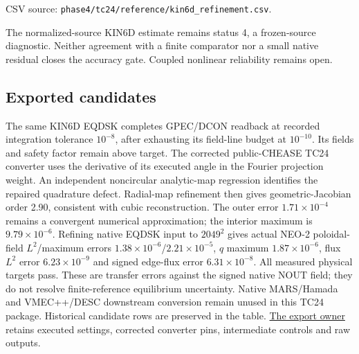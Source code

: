 \documentclass[10pt,a4paper]{article}
\newcommand{\tcroot}{https://gitlab.tugraz.at/plasma/proj/ntv/iter_tc24/-/blob/5f267d12c/}
\newcommand{\tcfile}[2]{\href{\tcroot#1}{#2}}
\newcommand{\dataref}[1]{{\footnotesize CSV source: \texttt{#1}}}
\begin{document}
\begin{center}\small

\end{center}
\dataref{phase4/tc24/reference/kin6d\_refinement.csv}.

The normalized-source KIN6D estimate remains status 4, a frozen-source
diagnostic. Neither agreement with a finite comparator nor a small native
residual closes the accuracy gate. Coupled nonlinear reliability remains open.

\subsection*{Exported candidates}
\begin{center}\small

\end{center}

The same KIN6D EQDSK completes GPEC/DCON readback at recorded integration
tolerance $10^{-8}$, after exhausting its field-line budget at $10^{-10}$.
Its fields and safety factor remain above target. The corrected public-CHEASE TC24 converter uses the derivative of its
executed angle in the Fourier projection weight. An independent noncircular
analytic-map regression identifies the repaired quadrature defect.
Radial-map refinement then gives geometric-Jacobian order 2.90, consistent
with cubic reconstruction. The outer error $1.71\times10^{-4}$ remains a
convergent numerical approximation; the interior maximum is
$9.79\times10^{-6}$. Refining native EQDSK input to $2049^2$ gives actual
NEO-2 poloidal-field $L^2$/maximum errors $1.38\times10^{-6}$/$2.21\times10^{-5}$,
$q$ maximum $1.87\times10^{-6}$, flux $L^2$ error $6.23\times10^{-9}$ and
signed edge-flux error $6.31\times10^{-8}$. All measured physical targets
pass. These are transfer errors against the signed native NOUT field;
they do not resolve finite-reference equilibrium uncertainty.
Native MARS/Hamada and VMEC++/DESC downstream conversion remain unused in
this TC24 package. Historical candidate rows are preserved in the table.
\tcfile{equilibrium/phase4/tc24/EXPORTS.md}{The export owner} retains executed
settings, corrected converter pins, intermediate controls and raw outputs.
\end{document}
